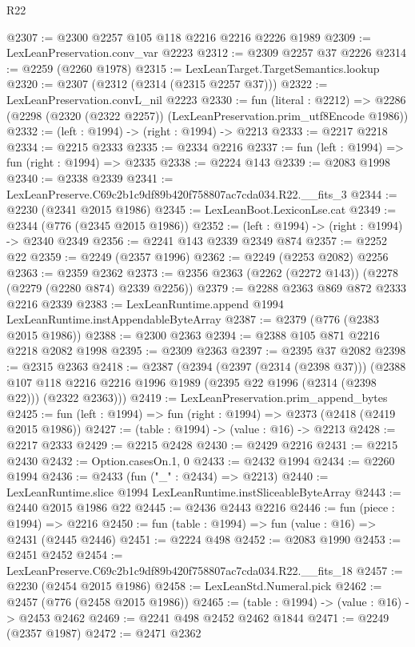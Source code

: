 \begin{lexlean}{R22}
\begin{coremodule}
@2307 := @2300 @2257 @105 @118 @2216 @2216 @2226 @1989
@2309 := LexLeanPreservation.conv_var @2223
@2312 := @2309 @2257 @37 @2226
@2314 := @2259 (@2260 @1978)
@2315 := LexLeanTarget.TargetSemantics.lookup
@2320 := @2307 (@2312 (@2314 (@2315 @2257 @37)))
@2322 := LexLeanPreservation.convL_nil @2223
@2330 := fun (literal : @2212) =>
  @2286 (@2298 (@2320 (@2322 @2257)) (LexLeanPreservation.prim_utf8Encode @1986))
@2332 := (left : @1994) -> (right : @1994) -> @2213
@2333 := @2217 @2218
@2334 := @2215 @2333
@2335 := @2334 @2216
@2337 := fun (left : @1994) => fun (right : @1994) => @2335
@2338 := @2224 @143
@2339 := @2083 @1998
@2340 := @2338 @2339
@2341 := LexLeanPreserve.C69c2b1c9df89b420f758807ac7cda034.R22.__fits_3
@2344 := @2230 (@2341 @2015 @1986)
@2345 := LexLeanBoot.LexiconLse.cat
@2349 := @2344 (@776 (@2345 @2015 @1986))
@2352 := (left : @1994) -> (right : @1994) -> @2340 @2349
@2356 := @2241 @143 @2339 @2349 @874
@2357 := @2252 @22
@2359 := @2249 (@2357 @1996)
@2362 := @2249 (@2253 @2082) @2256
@2363 := @2359 @2362
@2373 := @2356 @2363 (@2262 (@2272 @143)) (@2278 (@2279 (@2280 @874) @2339 @2256))
@2379 := @2288 @2363 @869 @872 @2333 @2216 @2339
@2383 := LexLeanRuntime.append @1994 LexLeanRuntime.instAppendableByteArray
@2387 := @2379 (@776 (@2383 @2015 @1986))
@2388 := @2300 @2363
@2394 := @2388 @105 @871 @2216 @2218 @2082 @1998
@2395 := @2309 @2363
@2397 := @2395 @37 @2082
@2398 := @2315 @2363
@2418 := @2387
    (@2394
      (@2397 (@2314 (@2398 @37)))
      (@2388 @107 @118 @2216 @2216 @1996 @1989 (@2395 @22 @1996 (@2314 (@2398 @22))) (@2322 @2363)))
@2419 := LexLeanPreservation.prim_append_bytes
@2425 := fun (left : @1994) => fun (right : @1994) => @2373 (@2418 (@2419 @2015 @1986))
@2427 := (table : @1994) -> (value : @16) -> @2213
@2428 := @2217 @2333
@2429 := @2215 @2428
@2430 := @2429 @2216
@2431 := @2215 @2430
@2432 := Option.casesOn.{1, 0}
@2433 := @2432 @1994
@2434 := @2260 @1994
@2436 := @2433 (fun ("_" : @2434) => @2213)
@2440 := LexLeanRuntime.slice @1994 LexLeanRuntime.instSliceableByteArray
@2443 := @2440 @2015 @1986 @22
@2445 := @2436 @2443 @2216
@2446 := fun (piece : @1994) => @2216
@2450 := fun (table : @1994) => fun (value : @16) => @2431 (@2445 @2446)
@2451 := @2224 @498
@2452 := @2083 @1990
@2453 := @2451 @2452
@2454 := LexLeanPreserve.C69c2b1c9df89b420f758807ac7cda034.R22.__fits_18
@2457 := @2230 (@2454 @2015 @1986)
@2458 := LexLeanStd.Numeral.pick
@2462 := @2457 (@776 (@2458 @2015 @1986))
@2465 := (table : @1994) -> (value : @16) -> @2453 @2462
@2469 := @2241 @498 @2452 @2462 @1844
@2471 := @2249 (@2357 @1987)
@2472 := @2471 @2362

\end{coremodule}
\end{lexlean}
